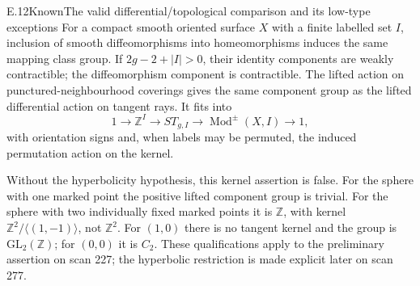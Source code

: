 \begin{statement}{E.12}{Known}{The valid differential/topological comparison and its low-type exceptions}
For a compact smooth oriented surface $X$ with a finite labelled
set $I$, inclusion of smooth diffeomorphisms into homeomorphisms
induces the same mapping class group.  If $2g-2+|I|>0$, their
identity components are weakly contractible; the diffeomorphism
component is contractible.  The lifted action on punctured-neighbourhood
coverings gives the same component group as the lifted differential
action on tangent rays.  It fits into
\[
 1\to\mathbb Z^I\to ST_{g,I}\to\operatorname{Mod}^{\pm}(X,I)\to1,
\]
with orientation signs and, when labels may be permuted, the induced
permutation action on the kernel.

Without the hyperbolicity hypothesis, this kernel assertion is false.
For the sphere with one marked point the positive lifted component
group is trivial.  For the sphere with two individually fixed marked
points it is $\mathbb Z$, with kernel
$\mathbb Z^2/\langle(1,-1)\rangle$, not $\mathbb Z^2$.
For $(1,0)$ there is no tangent kernel and the group is
$\mathrm{GL}_2(\mathbb Z)$; for $(0,0)$ it is $C_2$.
These qualifications apply to the preliminary assertion on scan 227;
the hyperbolic restriction is made explicit later on scan 277.
\end{statement}
